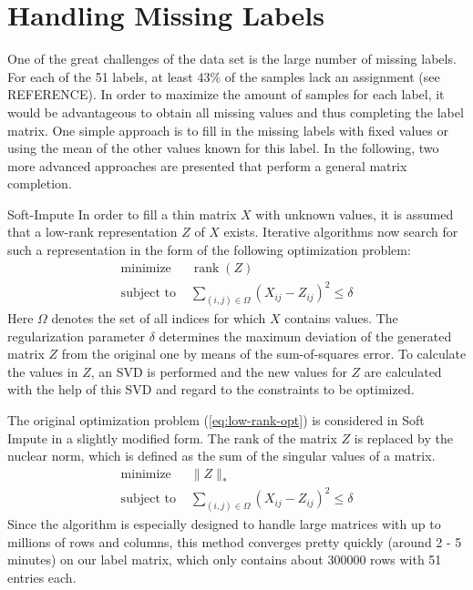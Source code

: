 \section{Handling Missing Labels}
One of the great challenges of the data set is the large number of missing labels. For each of the 51 labels, at least 43\% of the samples lack an assignment (see REFERENCE). In order to maximize the amount of samples for each label, it would be advantageous to obtain all missing values and thus completing the label matrix. One simple approach is to fill in the missing labels with fixed values or using the mean of the other values known for this label. In the following, two more advanced approaches are presented that perform a general matrix completion.

\begin{subsection}{Soft-Impute}
	In order to fill a thin matrix $X$ with unknown values, it is assumed that a low-rank representation $Z$ of $X$ exists. Iterative algorithms now search for such a representation in the form of the following optimization problem:
	\begin{equation} \label{eq:low-rank-opt}
		\begin{split}
			\text{minimize } &\operatorname{rank}(Z) \\
			\text{subject to } &\sum_{(i,j)\in \Omega} (X_{ij} - Z_{ij})^2 \leq \delta
		\end{split}	
	\end{equation}
	Here $\Omega$ denotes the set of all indices for which $X$ contains values. The regularization parameter $\delta$ determines the maximum deviation of the generated matrix $Z$ from the original one by means of the sum-of-squares error. To calculate the values in $Z$, an SVD is performed and the new values for $Z$ are calculated with the help of this SVD and regard to the constraints to be optimized.\par
	The original optimization problem (\ref{eq:low-rank-opt}) is considered in Soft Impute in a slightly modified form. The rank of the matrix $Z$ is replaced by the nuclear norm, which is defined as the sum of the singular values of a matrix. \cite{mazumder2010spectral}	
	\begin{equation} \label{eq:low-rank-soft-opt}
	\begin{split}
	\text{minimize } & \| Z \|_* \\
	\text{subject to } &\sum_{(i,j)\in \Omega} (X_{ij} - Z_{ij})^2 \leq \delta
	\end{split}
	\end{equation}
	Since the algorithm is especially designed to handle large matrices with up to millions of rows and columns, this method converges pretty quickly (around 2 - 5 minutes) on our label matrix, which only contains about 300000 rows with 51 entries each. 
\end{subsection}

